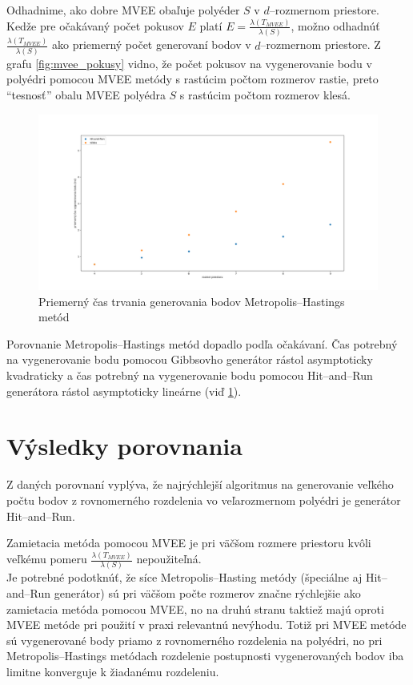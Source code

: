 Odhadnime, ako dobre MVEE obaľuje polyéder $S$ v $d$--rozmernom priestore. Kedže pre očakávaný počet pokusov $E$ platí $E=\frac{\lambda(T_{MVEE})}{\lambda(S)}$, možno odhadnúť $\frac{\lambda(T_{MVEE})}{\lambda(S)}$ ako priemerný počet generovaní bodov v $d$--rozmernom priestore. Z grafu \ref{fig:mvee_pokusy} vidno, že počet pokusov na vygenerovanie bodu v polyédri pomocou MVEE metódy s rastúcim počtom rozmerov rastie, preto ``tesnosť'' obalu MVEE polyédra $S$ s rastúcim počtom rozmerov klesá.

\begin{figure} [H]
  \includegraphics[width=\linewidth]{images/mh.png}
  \caption{Priemerný čas trvania generovania bodov Metropolis--Hastings metód}
  \label{fig:mh}
\end{figure}

Porovnanie Metropolis--Hastings metód dopadlo podľa očakávaní. Čas potrebný na vygenerovanie bodu pomocou Gibbsovho generátor rástol asymptoticky kvadraticky a čas potrebný na vygenerovanie bodu pomocou Hit--and--Run generátora rástol asymptoticky lineárne (viď \ref{fig:mh}).\\

\section{Výsledky porovnania}

Z daných porovnaní vyplýva, že najrýchlejší algoritmus na generovanie veľkého počtu bodov z rovnomerného rozdelenia vo veľarozmernom polyédri je generátor Hit--and--Run.

Zamietacia metóda pomocou MVEE je pri väčšom rozmere priestoru kvôli veľkému pomeru $\frac{\lambda(T_{MVEE})}{\lambda(S)}$ nepoužiteľná.\\

Je potrebné podotknúť, že síce Metropolis--Hasting metódy (špeciálne aj Hit--and--Run generátor) sú pri väčšom počte rozmerov značne rýchlejšie ako zamietacia metóda pomocou MVEE, no na druhú stranu taktiež majú oproti MVEE metóde pri použití v praxi relevantnú nevýhodu. Totiž pri MVEE metóde sú vygenerované body priamo z rovnomerného rozdelenia na polyédri, no pri Metropolis--Hastings metódach rozdelenie postupnosti vygenerovaných bodov iba limitne konverguje k žiadanému rozdeleniu.

